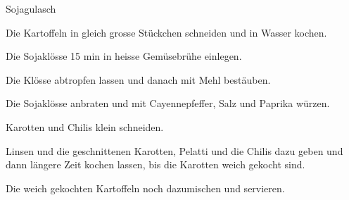 
\begin{recipe}[]{Sojagulasch}{}{}



\step
Die Kartoffeln in gleich grosse St\"uckchen schneiden und in Wasser kochen.

\step
Die Sojakl\"osse 15 min in heisse Gem\"usebr\"uhe einlegen.

\step
Die Kl\"osse abtropfen lassen und danach mit Mehl best\"auben.

\step
Die Sojakl\"osse anbraten und mit Cayennepfeffer, Salz und Paprika w\"urzen.

\step
Karotten und Chilis klein schneiden.

\step
Linsen und die geschnittenen Karotten, Pelatti und die Chilis dazu geben und dann l\"angere Zeit kochen lassen, bis die Karotten weich gekocht sind.

\step
Die weich gekochten Kartoffeln noch dazumischen und servieren.

\end{recipe}